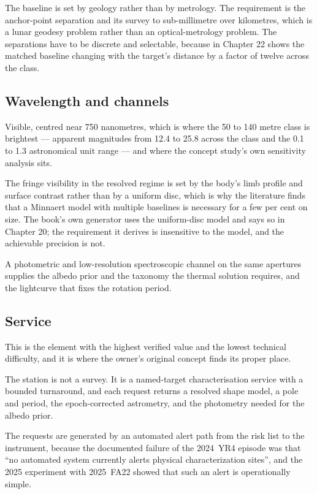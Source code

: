 The baseline is set by geology rather than by metrology. The requirement is
the anchor-point separation and its survey to sub-millimetre over kilometres,
which is a lunar geodesy problem rather than an optical-metrology problem.
The separations have to be discrete and selectable, because
 in Chapter 22 shows the matched baseline
changing with the target's distance by a factor of twelve across the
class.

\subsection{Wavelength and channels}

Visible, centred near 750 nanometres, which is where the 50 to 140 metre
class is brightest --- apparent magnitudes from 12.4 to 25.8 across the class
and the 0.1 to 1.3 astronomical unit range --- and where the concept study's
own sensitivity analysis sits.

The fringe visibility in the resolved regime is set by the body's limb
profile and surface contrast rather than by a uniform disc, which is why the
literature finds that a Minnaert model with multiple baselines is necessary
for a few per cent on size. The book's own generator uses the uniform-disc
model and says so in Chapter 20; the requirement it derives is insensitive
to the model, and the achievable precision is not.

A photometric and low-resolution spectroscopic channel on the same apertures
supplies the albedo prior and the taxonomy the thermal solution requires,
and the lightcurve that fixes the rotation period.

\subsection{Service}

This is the element with the highest verified value and the lowest technical
difficulty, and it is where the owner's original concept finds its proper
place.

The station is not a survey. It is a named-target characterisation service
with a bounded turnaround, and each request returns a resolved shape model,
a pole and period, the epoch-corrected astrometry, and the photometry
needed for the albedo prior.

The requests are generated by an automated alert path from the risk list to
the instrument, because the documented failure of the 2024~YR4 episode was
that ``no automated system currently alerts physical characterization
sites'', and the 2025 experiment with 2025~FA22 showed that such an alert is
operationally simple.

